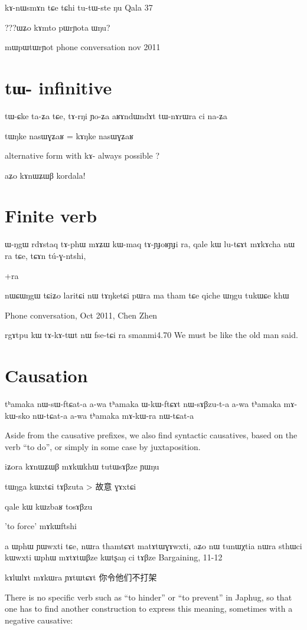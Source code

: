 \documentclass[oldfontcommands,oneside,a4paper,11pt]{memoir}
\newcommand{\wav}[1]{}%
\begin{document}
kɤ-nɯsmɤn	tɕe	tɕhi	tu-tɯ-ste	ŋu
Qala 37


???ɯʑo kɤmto pɯrɲota ɯŋu?

mɯpɯtɯrɲot
phone conversation nov 2011

\section{tɯ- infinitive} 
tɯ-ɕke ta-ʑa tɕe, 
tɤ-rŋi	ɲo-ʑa
aʁɤndɯndɤt	tɯ-nɤrɯra	ci	na-ʑa

tɯŋke nasɯɣʑaʁ = kɤŋke nasɯɣʑaʁ

alternative form with kɤ- always possible ?


aʑo kɤnɯʑɯβ kordala!
\section{Finite verb}
ɯ-ŋgɯ	rdɤstaq	tɤ-phɯ	mɤʑɯ	kɯ-maq	tɤ-ɲɟoʁɲɟi	ra,	qale	kɯ	lu-tɕɤt	mɤkɤcha	nɯ	ra	tɕe,	tɕɤn	tú-ɣ-ntshi,

+ra

nɯɕɯŋgɯ tɕiʑo laritɕi nɯ tɤŋketɕi pɯra ma tham tɕe qiche ɯŋgu tukɯɕe khɯ
\wav{8_tANketCipWra}
Phone conversation, Oct 2011, Chen Zhen


rgɤtpu kɯ tɤ-kɤ-tɯt nɯ fse-tɕi ra
smanmi4.70
We must be like the old man said.
\section{Causation} \label{sec:causation.complement}

tʰamaka nɯ-sɯ-ftɕat-a
a-wa tʰamaka ɯ-kɯ-ftɕɤt nɯ-sɤβzu-t-a
a-wa tʰamaka mɤ-kɯ-sko nɯ-tɕat-a
a-wa tʰamaka mɤ-kɯ-ra nɯ-tɕat-a
\wav{8_causatifs_complexes}

Aside from the causative prefixes, we also find syntactic causatives, based on the verb  ``to do'', or simply in some case by juxtaposition.

 iʑora kɤnɯʑɯβ mɤkɯkhɯ tutɯsɤβze ɲɯŋu

tɯŋga kɯxtɕi tɤβzuta > 故意 ɣɤxtɕi
 

qale kɯ kɯzbaʁ tosɤβzu

'to force' mɤkɯftshi

a ɯphɯ ɲɯwxti tɕe, nɯra thamtɕɤt matɤtɯɣɤwxti, aʑo nɯ tunɯχtia
nɯra sthɯci kɯwxti ɯphɯ mɤtɤtɯβze kɯtʂaŋ ci tɤβze
Bargaining, 11-12


kɤlɯlɤt mɤkɯra ɲɤtɯtɕɤt \wav{mAkWra}
你令他们不打架


There is no specific verb such as ``to hinder'' or ``to prevent'' in Japhug, so that one has to find another construction to express this meaning, sometimes with a negative causative:
\end{document}
